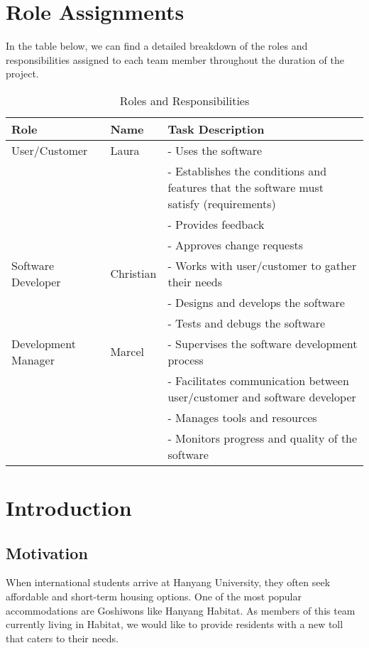 \documentclass[conference]{IEEEtran}
\begin{document}
\section*{Role Assignments}
In the table below, we can find a detailed breakdown of the roles and responsibilities assigned to each team member throughout the duration of the project.
\begin{table}[htbp]
\centering
\begin{tabular}{|p{1.6cm}|l|p{3.6cm}|}
\hline
\textbf{Role} & \textbf{Name} & \textbf{Task Description}\\
\hline
User/Customer & Laura & 
- Uses the software \\
& & 
- Establishes the conditions and features that the software must satisfy (requirements) \\
& & 
- Provides feedback \\
& & 
- Approves change requests\\
\hline
Software Developer & Christian & 
- Works with user/customer to gather their needs \\
& & 
- Designs and develops the software \\
& & 
- Tests and debugs the software\\
\hline
Development Manager & Marcel & 
- Supervises the software development process \\
& & 
- Facilitates communication between user/customer and software developer \\
& & 
- Manages tools and resources \\
& & 
- Monitors progress and quality of the software\\
\hline
\end{tabular}
\caption{Roles and Responsibilities}
\label{tab1}
\end{table}


\section{Introduction}
\subsection{Motivation}
When international students arrive at Hanyang University, they often seek affordable and short-term housing options. One of the most popular accommodations are Goshiwons like Hanyang Habitat. As members of this team currently living in Habitat, we would like to provide residents with a new toll that caters to their needs.
\end{document}
